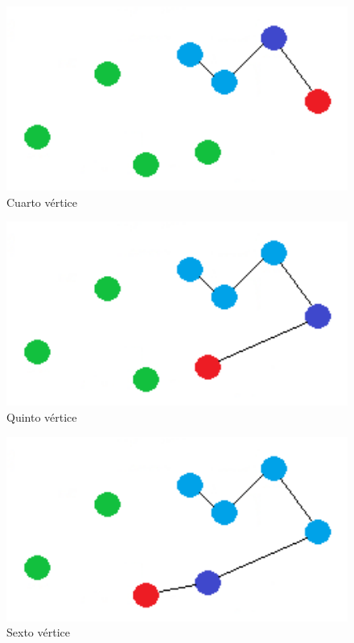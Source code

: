 \begin{figure}[htb] 
	\centering
	\includegraphics[width=1.75\textwidth]{./Imagenes/vecino3.png}
	\caption{Cuarto vértice} 
\end{figure}

\begin{figure}[htb] 
	\centering
	\includegraphics[width=1.75\textwidth]{./Imagenes/vecino4.png}
	\caption{Quinto vértice} 
\end{figure}

\begin{figure}[htb] 
	\centering
	\includegraphics[width=1.75\textwidth]{./Imagenes/vecino5.png}
	\caption{Sexto vértice} 
\end{figure}

